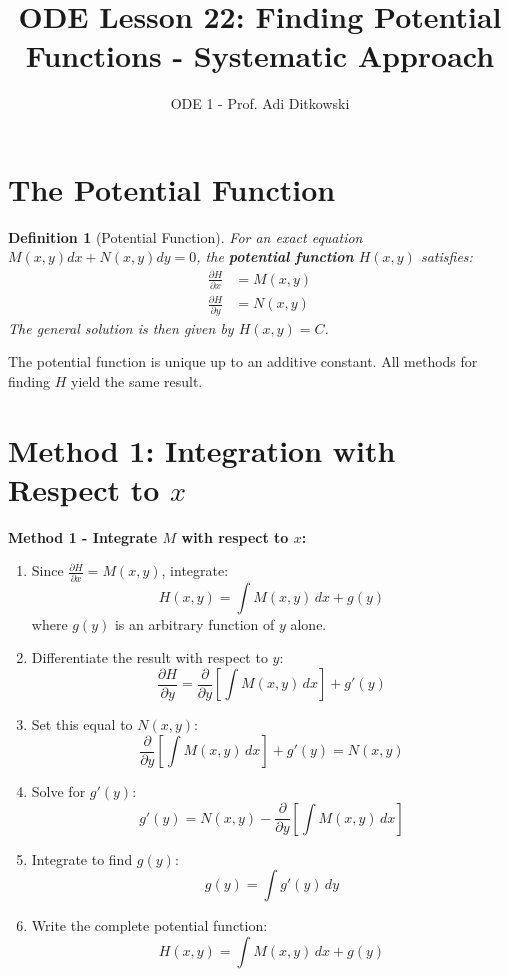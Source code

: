 \documentclass[12pt]{article}
\title{ODE Lesson 22: Finding Potential Functions - Systematic Approach}
\author{ODE 1 - Prof. Adi Ditkowski}
\date{}
\newtheorem{definition}{Definition}
\begin{document}
\maketitle

\section{The Potential Function}

\begin{definition}[Potential Function]
For an exact equation $M(x,y)dx + N(x,y)dy = 0$, the \textbf{potential function} $H(x,y)$ satisfies:
\begin{align}
\frac{\partial H}{\partial x} &= M(x,y) \\
\frac{\partial H}{\partial y} &= N(x,y)
\end{align}
The general solution is then given by $H(x,y) = C$.
\end{definition}

\begin{keypoint}
The potential function is unique up to an additive constant. All methods for finding $H$ yield the same result.
\end{keypoint}

\section{Method 1: Integration with Respect to $x$}

\begin{algorithm}
\textbf{Method 1 - Integrate $M$ with respect to $x$:}
\begin{enumerate}
    \item Since $\frac{\partial H}{\partial x} = M(x,y)$, integrate:
    \[H(x,y) = \int M(x,y)\,dx + g(y)\]
    where $g(y)$ is an arbitrary function of $y$ alone.

    \item Differentiate the result with respect to $y$:
    \[\frac{\partial H}{\partial y} = \frac{\partial}{\partial y}\left[\int M(x,y)\,dx\right] + g'(y)\]

    \item Set this equal to $N(x,y)$:
    \[\frac{\partial}{\partial y}\left[\int M(x,y)\,dx\right] + g'(y) = N(x,y)\]

    \item Solve for $g'(y)$:
    \[g'(y) = N(x,y) - \frac{\partial}{\partial y}\left[\int M(x,y)\,dx\right]\]

    \item Integrate to find $g(y)$:
    \[g(y) = \int g'(y)\,dy\]

    \item Write the complete potential function:
    \[H(x,y) = \int M(x,y)\,dx + g(y)\]
\end{enumerate}
\end{algorithm}
\end{document}
